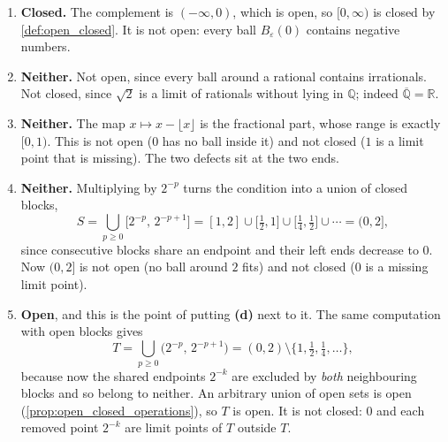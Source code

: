 \begin{exercisesolution}
\label{sol:open_closed_self_test}
\begin{enumerate}[label=\textbf{(\alph*)}]
  \item \textbf{Closed.} The complement is $(-\infty,0)$, which is open, so $[0,\infty)$ is
    closed by \cref{def:open_closed}. It is not open: every ball $B_\varepsilon(0)$ contains
    negative numbers.
  \item \textbf{Neither.} Not open, since every ball around a rational contains irrationals.
    Not closed, since $\sqrt2$ is a limit of rationals without lying in $\mathbb{Q}$; indeed
    $\overline{\mathbb{Q}} = \mathbb{R}$.
  \item \textbf{Neither.} The map $x \mapsto x - \lfloor x\rfloor$ is the fractional part, whose
    range is exactly $[0,1)$. This is not open ($0$ has no ball inside it) and not closed
    ($1$ is a limit point that is missing). The two defects sit at the two ends.
  \item \textbf{Neither.} Multiplying by $2^{-p}$ turns the condition into a union of closed
    blocks,
    \[S = \bigcup_{p\geq0}\big[2^{-p},\,2^{-p+1}\big]
        = [1,2] \cup \big[\tfrac12,1\big] \cup \big[\tfrac14,\tfrac12\big] \cup \cdots
        = (0,2],\]
    since consecutive blocks share an endpoint and their left ends decrease to $0$. Now $(0,2]$
    is not open (no ball around $2$ fits) and not closed ($0$ is a missing limit point).
  \item \textbf{Open}, and this is the point of putting \textbf{(d)} next to it. The same
    computation with open blocks gives
    \[T = \bigcup_{p\geq0}\big(2^{-p},\,2^{-p+1}\big)
        = (0,2)\setminus\big\{1,\tfrac12,\tfrac14,\dots\big\},\]
    because now the shared endpoints $2^{-k}$ are excluded by \emph{both} neighbouring blocks
    and so belong to neither. An arbitrary union of open sets is open
    (\cref{prop:open_closed_operations}), so $T$ is open. It is not closed: $0$ and each
    removed point $2^{-k}$ are limit points of $T$ outside $T$.


\end{enumerate}
\end{exercisesolution}
